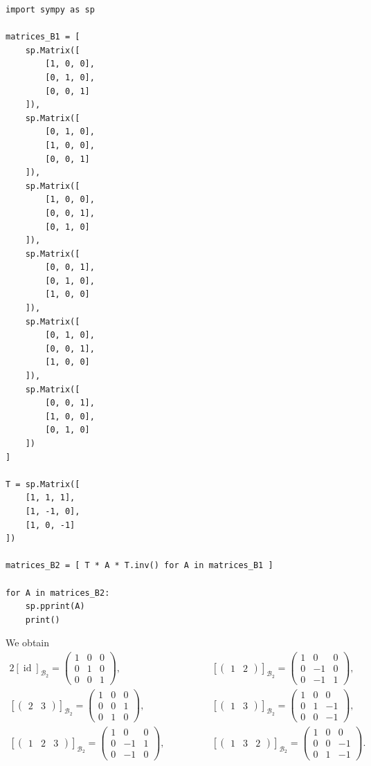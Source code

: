 \documentclass[a4paper, 12pt]{article}
\DeclareMathOperator{\id}{id}
\newcommand{\mc}[1]{\mathcal{#1}}
\begin{document}
\begin{verbatim}
import sympy as sp

matrices_B1 = [
    sp.Matrix([
        [1, 0, 0],
        [0, 1, 0],
        [0, 0, 1]
    ]),
    sp.Matrix([
        [0, 1, 0],
        [1, 0, 0],
        [0, 0, 1]
    ]),
    sp.Matrix([
        [1, 0, 0],
        [0, 0, 1],
        [0, 1, 0]
    ]),
    sp.Matrix([
        [0, 0, 1],
        [0, 1, 0],
        [1, 0, 0]
    ]),
    sp.Matrix([
        [0, 1, 0],
        [0, 0, 1],
        [1, 0, 0]
    ]),
    sp.Matrix([
        [0, 0, 1],
        [1, 0, 0],
        [0, 1, 0]
    ])
]

T = sp.Matrix([
    [1, 1, 1],
    [1, -1, 0],
    [1, 0, -1]
])

matrices_B2 = [ T * A * T.inv() for A in matrices_B1 ]

for A in matrices_B2:
    sp.pprint(A)
    print()
\end{verbatim}
We obtain
\begin{alignat*}{2}
    [\id]_{\mc{B}_2} = \begin{pmatrix} 1&0&0 \\ 0&1&0 \\ 0&0&1 \end{pmatrix}, & \hspace{4em} [\begin{pmatrix} 1&2 \end{pmatrix}]_{\mc{B}_2} = \begin{pmatrix} 1&0&0 \\ 0&-1&0 \\ 0&-1&1 \end{pmatrix}, \\
    [\begin{pmatrix} 2&3 \end{pmatrix}]_{\mc{B}_2} = \begin{pmatrix} 1&0&0 \\ 0&0&1 \\ 0&1&0 \end{pmatrix}, & \hspace{4em} [\begin{pmatrix} 1&3 \end{pmatrix}]_{\mc{B}_2} = \begin{pmatrix} 1&0&0 \\ 0&1&-1 \\ 0&0&-1 \end{pmatrix}, \\
    [\begin{pmatrix} 1&2&3 \end{pmatrix}]_{\mc{B}_2} = \begin{pmatrix} 1&0&0 \\ 0&-1&1 \\ 0&-1&0 \end{pmatrix}, & \hspace{4em} [\begin{pmatrix} 1&3&2 \end{pmatrix}]_{\mc{B}_2} = \begin{pmatrix} 1&0&0 \\ 0&0&-1 \\ 0&1&-1 \end{pmatrix}.
\end{alignat*}
\end{document}
